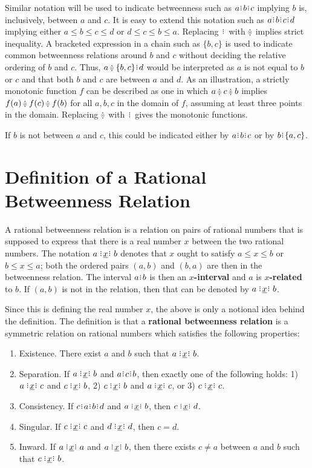 \documentclass[12pt]{article}
\begin{document}
Similar notation will be used to indicate betweenness such as $a \rint b\rint c$ implying $b$ is, inclusively, between $a$ and $c$. It is easy to extend this notation such as $a \rint b \rint c \rint d$ implying either $a \leq b \leq c \leq d$ or $d \leq c \leq b \leq a$. Replacing $\rint$ with $\betneq$ implies strict inequality. A bracketed expression in a chain such as $\{b, c\}$ is used to indicate common betweenness relations around $b$ and $c$ without deciding the relative ordering of $b$ and $c$. Thus, $a \betneq \{b, c \} \rint d$ would be interpreted as $a$ is not equal to $b$ or $c$ and that both $b$ and $c$ are between $a$ and $d$. As an illustration, a strictly monotonic function $f$ can be described as one in which $a \betneq c \betneq b$ implies $f(a) \betneq f(c) \betneq f(b)$ for all $a,b,c$ in the domain of $f$, assuming at least three points in the domain. Replacing $\betneq$ with $\rint$ gives the monotonic functions. 

If $b$ is not between $a$ and $c$, this could be indicated either by \sout{$a \rint b\rint c$} or by $b\rint \{a,c\}$.

\section{Definition of a Rational Betweenness Relation}

A rational betweenness relation is a relation on pairs of rational numbers that is supposed to express that there is a real number $x$ between the two rational numbers. The notation $a \xrel b$ denotes that $x$ ought to satisfy $a \leq x \leq b$ or $b \leq x \leq a$;  both the ordered pairs $(a,b)$ and $(b,a)$ are then in the betweenness relation. The interval $a \rint b$ is then an \textbf{$x$-interval} and $a$ is \textbf{$x$-related} to $b$. If $(a,b)$ is not in the relation, then that can be denoted by \sout{$a \xrel b$}. 

Since this is defining the real number $x$, the above is only a notional idea behind the definition. The definition is that a \textbf{rational betweenness relation} is a symmetric relation on rational numbers 
which satisfies the following properties:
\begin{enumerate}
    \item Existence. There exist $a$ and $b$ such that $a\xrel b$.
    \item Separation. If $a \xrel b$ and $a \rint  c \rint  b$, then exactly one of the following holds: 1) $a \xrel c$ and \sout{$c \xrel b$}, 2) $c \xrel b$ and \sout{$a \xrel c$}, or 3) $c \xrel c$. 
    \item Consistency. If $c \rint  a \rint b \rint  d$ and $a \xrel b$, then $c \xrel d$. 
    \item Singular. If $c \xrel c$ and $d \xrel d$, then $c=d$. 
    \item Inward. If \sout{$a \xrel a$} and $a \xrel b$, then there exists $c \neq a$ between $a$ and $b$ such that $c \xrel b$. 
\end{enumerate}
\end{document}
